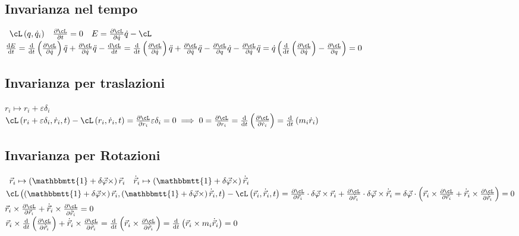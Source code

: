 \documentclass[a4paper,NoNotes,GeneralMath,12pt]{stdmdoc}
\begin{document}
	\subsection*{Invarianza nel tempo}
	$\begin{array}{ccc} \cL\left(q, \dot{q}_i\right) & \dpar{\cL}{t} = 0 & E = \dpar{\cL}{\dot{q}} \dot{q} - \cL \end{array}$ \\ $\de{E}{t} = \de{}{t}\left(\dpar{\cL}{\dot{q}}\right) \ddot{q} + \dpar{\cL}{\dot{q}} \ddot{q} - \de{\cL}{t} = \de{}{t}\left(\dpar{\cL}{\dot{q}}\right) \ddot{q} + \dpar{\cL}{\dot{q}} \ddot{q} - \dpar{\cL}{q} \dot{q} - \dpar{\cL}{\dot{q}} \ddot{q} = \dot{q} \left(\de{}{t} \left(\dpar{\cL}{\dot{q}}\right) - \dpar{\cL}{q}\right) = 0$

	\subsection*{Invarianza per traslazioni}
	$r_i \mapsto r_i + \varepsilon \delta_i$ \\ $\cL \left(r_i + \varepsilon \delta_i, \dot{r}_i, t\right) - \cL \left(r_i, \dot{r}_i, t\right) = \dpar{\cL}{r_i} \varepsilon \delta_i = 0 \implies 0 = \dpar{\cL}{r_i} = \de{}{t} \left(\dpar{\cL}{\dot{r}_i}\right) = \de{}{t} \left(m_i \dot{r}_i \right)$

	\subsection*{Invarianza per Rotazioni}
	$\begin{array}{cc} \vec{r}_i \mapsto \left(\mathbbmtt{1} + \delta \vec{\varphi}\times \right) \vec{r}_i & \dot{\vec{r}}_i \mapsto \left(\mathbbmtt{1} + \delta \vec{\varphi} \times\right) {\dot{\vec{r}}_i} \end{array}$ \\
	$\cL\left( \left(\mathbbmtt{1} + \delta \vec{\varphi} \times\right) \vec{r}_i, \left(\mathbbmtt{1} + \delta \vec{\varphi} \times\right) \dot{\vec{r}}_i, t\right) - \cL\left( \vec{r}_i, \dot{\vec{r}}_i, t\right) = \dpar{\cL}{\vec{r}_i} \cdot \delta \vec{\varphi}\times \vec{r}_i + \dpar{\cL}{\dot{\vec{r}}_i} \cdot \delta \vec{\varphi} \times \dot{\vec{r}}_i = \delta \vec{\varphi} \cdot \left( \vec{r}_i \times \dpar{\cL}{\vec{r}_i} + \dot{\vec{r}}_i \times \dpar{\cL}{\dot{\vec{r}}_i} \right) = 0$ \\
	$\vec{r}_i \times \dpar{\cL}{\vec{r}_i} + \dot{\vec{r}}_i \times \dpar{\cL}{\dot{\vec{r}}_i} = 0$ \\ $\vec{r}_i \times \de{}{t} \left( \dpar{\cL}{\dot{\vec{r}}_i} \right) + \dot{\vec{r}}_i \times \dpar{\cL}{\dot{\vec{r}}_i} = \de{}{t} \left( \vec{r}_i \times \dpar{\cL}{\dot{\vec{r}}_i} \right) = \de{}{t} \left( \vec{r}_i \times m_i \dot{\vec{r}}_i \right) = 0$
\end{document}
